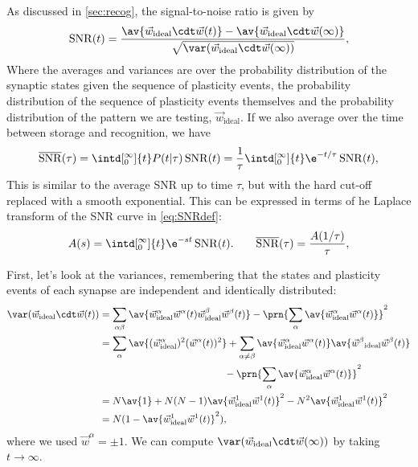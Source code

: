 \documentclass[12pt]{article}
\newcommand{\syn}{\vec{w}}
\newcommand{\synid}{\syn_\text{ideal}}
\DeclareMathOperator{\snr}{SNR}
\newcommand{\snrb}{\overline{\snr}}
\begin{document}
As discussed in \autoref{sec:recog}, the signal-to-noise ratio is given by
%
\begin{equation}\label{eq:SNRdef}
  \snr(t) = \frac{\av{\syn_\text{ideal}\cdt\syn(t)} - \av{\syn_\text{ideal}\cdt\syn(\infty)}}
     {\sqrt{\var(\syn_\text{ideal}\cdt\syn(\infty))}},
\end{equation}
%
Where the averages and variances are over the probability distribution of the synaptic states given the sequence of plasticity events, the probability distribution of the sequence of plasticity events themselves and the probability distribution of the pattern we are testing, $\synid$.
If we also average over the time between storage and recognition, we have
%
\begin{equation}\label{eq:snrb}
  \snrb(\tau) = \intd[_0^\infty]{t} P(t\vert\tau) \snr(t)
   = \frac{1}{\tau} \intd[_0^\infty]{t} \e^{-t/\tau} \snr(t),
\end{equation}
%
This is similar to the average SNR up to time $\tau$, but with the hard cut-off replaced with a smooth exponential.
This can be expressed in terms of he Laplace transform of the SNR curve in \eqref{eq:SNRdef}:
%
\begin{equation}\label{eq:laplacedef}
  A(s) = \intd[_0^\infty]{t} \e^{-st} \snr(t).
  \qquad
  \snrb(\tau) = \frac{A(1/\tau)}{\tau},
\end{equation}
%


First, let's look at the variances, remembering that the states and plasticity events of each synapse are independent and identically distributed:
%
\begin{equation}\label{eq:noise}
\begin{aligned}
  \var(\syn_\text{ideal}\cdt\syn(t))
    &= \sum_{\alpha\beta} \av{\syn^\alpha_\text{ideal}\syn^\alpha(t) \syn^\beta_\text{ideal}\syn^\beta(t)}
    - \prn{\sum_\alpha \av{\syn^\alpha_\text{ideal}\syn^\alpha(t)}}^2 \\
    &= \sum_{\alpha} \av{(\syn^\alpha_\text{ideal})^2(\syn^\alpha(t))^2}
    + \sum_{\alpha\neq\beta} \av{\syn^\alpha_\text{ideal}\syn^\alpha(t)}\av{\smash{\syn^\beta}_\text{ideal}\smash{\syn^\beta}(t)}
    \\&\phantom{= \sum_{\alpha}  \av{(\syn^\alpha_\text{ideal})^2(\syn^\alpha(t))^2}}
    - \prn{\sum_\alpha \av{\syn^\alpha_\text{ideal}\syn^\alpha(t)}}^2  \\
    &= N\av{1}
    + N(N-1)\av{\syn^1_\text{ideal}\syn^1(t)}^2
    - N^2\av{\syn^1_\text{ideal}\syn^1(t)}^2 \\
    &= N(1-\av{\syn^1_\text{ideal}\syn^1(t)}^2),
\end{aligned}
\end{equation}
%
where we used $\syn^\alpha=\pm1$.
We can compute $\var(\syn_\text{ideal}\cdt\syn(\infty))$ by taking $t\to\infty$.
\end{document}
